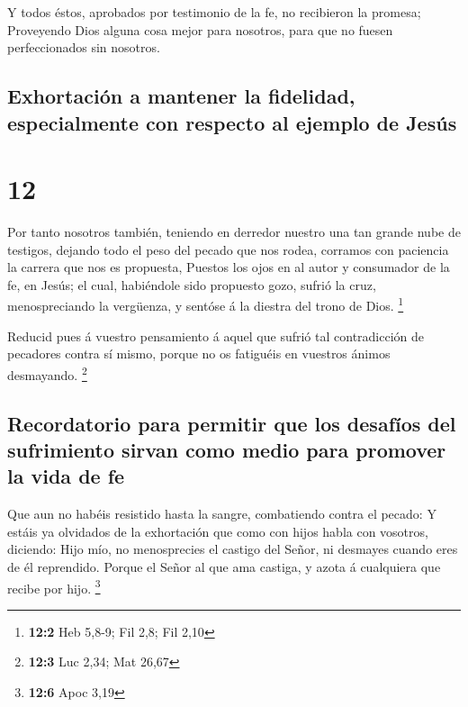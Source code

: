 Y todos éstos, aprobados por testimonio de la fe, no
recibieron la promesa;  Proveyendo Dios alguna cosa mejor
para nosotros, para que no fuesen perfeccionados sin nosotros.

\hypertarget{exhortaciuxf3n-a-mantener-la-fidelidad-especialmente-con-respecto-al-ejemplo-de-jesuxfas}{%
\subsection{Exhortación a mantener la fidelidad, especialmente con
respecto al ejemplo de
Jesús}\label{exhortaciuxf3n-a-mantener-la-fidelidad-especialmente-con-respecto-al-ejemplo-de-jesuxfas}}

\hypertarget{section-11}{%
\section{12}\label{section-11}}

 Por tanto nosotros también, teniendo en derredor nuestro
una tan grande nube de testigos, dejando todo el peso del pecado que nos
rodea, corramos con paciencia la carrera que nos es propuesta,
 Puestos los ojos en al autor y consumador de la fe, en
Jesús; el cual, habiéndole sido propuesto gozo, sufrió la cruz,
menospreciando la vergüenza, y sentóse á la diestra del trono de Dios.
\footnote{\textbf{12:2} Heb 5,8-9; Fil 2,8; Fil 2,10}

 Reducid pues á vuestro pensamiento á aquel que sufrió tal
contradicción de pecadores contra sí mismo, porque no os fatiguéis en
vuestros ánimos desmayando. \footnote{\textbf{12:3} Luc 2,34; Mat 26,67}

\hypertarget{recordatorio-para-permitir-que-los-desafuxedos-del-sufrimiento-sirvan-como-medio-para-promover-la-vida-de-fe}{%
\subsection{Recordatorio para permitir que los desafíos del sufrimiento
sirvan como medio para promover la vida de
fe}\label{recordatorio-para-permitir-que-los-desafuxedos-del-sufrimiento-sirvan-como-medio-para-promover-la-vida-de-fe}}

 Que aun no habéis resistido hasta la sangre, combatiendo
contra el pecado:  Y estáis ya olvidados de la exhortación
que como con hijos habla con vosotros, diciendo: Hijo mío, no
menosprecies el castigo del Señor, ni desmayes cuando eres de él
reprendido.  Porque el Señor al que ama castiga, y azota á
cualquiera que recibe por hijo. \footnote{\textbf{12:6} Apoc 3,19}

